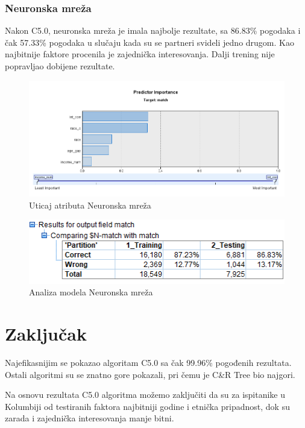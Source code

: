 \documentclass{article}
\begin{document}
\subsubsection{Neuronska mreža}
Nakon C5.0, neuronska mreža je imala najbolje rezultate, sa 86.83\% pogodaka i čak 57.33\% pogodaka u slučaju kada su se partneri svideli jedno drugom. Kao najbitnije faktore procenila je zajednička interesovanja. Dalji trening nije popravljao dobijene rezultate.
\begin{figure}[h!]
\centering
\includegraphics[scale=0.4]{graphics/impnn.png}
\caption{Uticaj atributa Neuronska mreža}
\label{fig:impnn}
\end{figure}
\begin{figure}[h!]
\centering
\includegraphics[scale=0.6]{graphics/analnn.png}
\caption{Analiza modela Neuronska mreža}
\label{fig:analnn}
\end{figure}
\FloatBarrier

\section{Zaključak}
Najefikasnijim se pokazao algoritam C5.0 sa čak 99.96\% pogođenih rezultata. Ostali algoritmi su se znatno gore pokazali, pri čemu je C\&R Tree bio najgori.\par
Na osnovu rezultata C5.0 algoritma možemo zaključiti da su za ispitanike u Kolumbiji od testiranih faktora najbitniji godine i etnička pripadnost, dok su zarada i zajednička interesovanja manje bitni.\par




\end{document}
